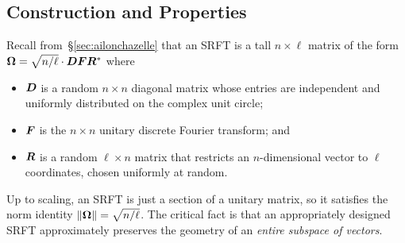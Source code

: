 \documentclass[final]{siamltex}
\newcounter{algorithm}[section]
\newcommand{\notate}[1]{\textcolor{red}{\textbf{[#1]}}}
\begin{document}





\subsection{Construction and Properties}

Recall from~\S\ref{sec:ailonchazelle} that an SRFT is a
tall $n \times \ell$ matrix of the form $\bm{\Omega} = \sqrt{n/\ell}
\cdot \bm{DFR}^*$ where

\lsp

\begin{itemize}
\item   $\bm{D}$ is a random $n \times n$ diagonal matrix whose
entries are independent and uniformly distributed on the complex
unit circle;

\item   $\bm{F}$ is the $n \times n$ unitary discrete Fourier
transform; and

\item   $\bm{R}$ is a random $\ell \times n$ matrix that
restricts an $n$-dimensional vector to $\ell$ coordinates, chosen
uniformly at random.
\end{itemize}

\lsp

\noindent
Up to scaling, an SRFT is just a section of a unitary matrix,
so it satisfies the norm identity $\left\Vert {\bm{\Omega}} \right\Vert = \sqrt{n/\ell}$.
The critical fact is that an appropriately designed SRFT approximately preserves
the geometry of an \emph{entire subspace of vectors}.
\end{document}
